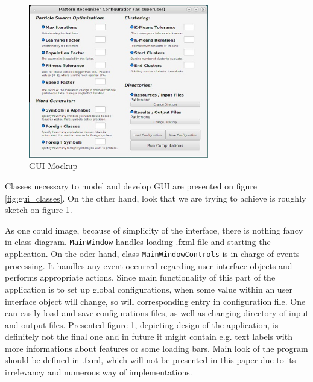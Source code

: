 \documentclass{mini}
\begin{document}
%
%
\begin{figure}
    \begin{center}
        \includegraphics[width=0.7\textwidth]{images/mock_gui.jpg}
    \end{center}
    \caption{GUI Mockup}
    \label{fig:gui_look}
\end{figure}

Classes necessary to model and develop GUI are presented on figure \ref{fig:gui_classes}. On the other hand, look that we are trying to achieve is roughly sketch on figure \ref{fig:gui_look}.

As one could image, because of simplicity of the interface, there is nothing fancy in class diagram. \texttt{MainWindow} handles loading .fxml file and starting the application. On the oder hand, class \texttt{MainWindowControls} is in charge of events processing. It handles any event occurred regarding user interface objects and performs appropriate actions. Since main functionality of this part of the application is to set up global configurations, when some value within an user interface object will change, so will corresponding entry in configuration file. One can easily load and save configurations files, as well as changing directory of input and output files. Presented figure \ref{fig:gui_look}, depicting design of the application, is definitely not the final one and in future it might contain e.g. text labels with more informations about features or some loading bars. Main look of the program should be defined in .fxml, which will not be presented in this paper due to its irrelevancy and numerous way of implementations. 
\end{document}
